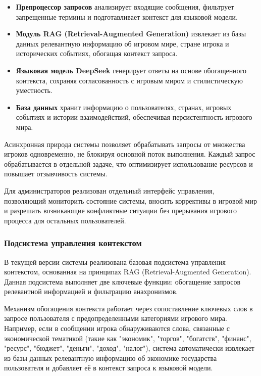 \begin{itemize}
\item \textbf{Препроцессор запросов} анализирует входящие сообщения, фильтрует запрещенные термины и подготавливает контекст для языковой модели.

\item \textbf{Модуль RAG (Retrieval-Augmented Generation)} извлекает из базы данных релевантную информацию об игровом мире, стране игрока и исторических событиях, обогащая контекст запроса.

\item \textbf{Языковая модель DeepSeek} генерирует ответы на основе обогащенного контекста, сохраняя согласованность с игровым миром и стилистическую уместность.

\item \textbf{База данных} хранит информацию о пользователях, странах, игровых событиях и истории взаимодействий, обеспечивая персистентность игрового мира.
\end{itemize}

Асинхронная природа системы позволяет обрабатывать запросы от множества игроков одновременно, не блокируя основной поток выполнения. Каждый запрос обрабатывается в отдельной задаче, что оптимизирует использование ресурсов и повышает отзывчивость системы.

Для администраторов реализован отдельный интерфейс управления, позволяющий мониторить состояние системы, вносить коррективы в игровой мир и разрешать возникающие конфликтные ситуации без прерывания игрового процесса для остальных пользователей.

\subsubsection{Подсистема управления контекстом}

В текущей версии системы реализована базовая подсистема управления контекстом, основанная на принципах RAG (Retrieval-Augmented Generation). Данная подсистема выполняет две ключевые функции: обогащение запросов релевантной информацией и фильтрацию анахронизмов.

Механизм обогащения контекста работает через сопоставление ключевых слов в запросе пользователя с предопределенными категориями игрового мира. Например, если в сообщении игрока обнаруживаются слова, связанные с экономической тематикой (такие как "{}экономик"{}, "{}торгов"{}, "{}богатств"{}, "{}финанс"{}, "{}ресурс"{}, "{}бюджет"{}, "{}деньги"{}, "{}доход"{}, "{}налог"{}), система автоматически извлекает из базы данных релевантную информацию об экономике государства пользователя и добавляет её в контекст запроса к языковой модели.

